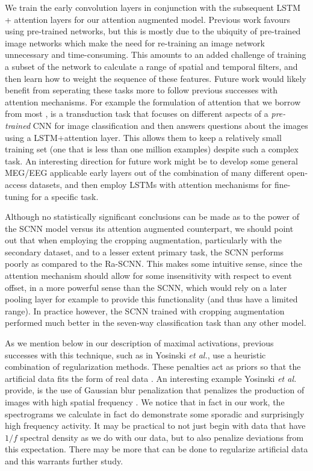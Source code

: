 \documentclass[fleqn,10pt]{wlscirep}
\begin{document}
We train the early convolution layers in conjunction with the subsequent LSTM + attention layers for our attention augmented model. Previous work favours using pre-trained networks, but this is mostly due to the ubiquity of pre-trained image networks which make the need for re-training an image network unnecessary and time-consuming. This amounts to an added challenge of training a subset of the network to calculate a range of spatial and temporal filters, and then learn how to weight the sequence of these features. Future work would likely benefit from seperating these tasks more to follow previous successes with attention mechanisms. For example the formulation of attention that we borrow from most \cite{Zhu}, is a transduction task that focuses on different aspects of a {\em pre-trained} CNN for image classification and then answers questions about the images using a LSTM+attention layer. This allows them to keep a relatively small training set (one that is less than one million examples) despite such a complex task. An interesting direction for future work might be to develop some general MEG/EEG applicable early layers out of the combination of many different open-access datasets, and then employ LSTMs with attention mechanisms for fine-tuning for a specific task.

Although no statistically significant conclusions can be made as to the power of the SCNN model versus its attention augmented counterpart, we should point out that when employing the cropping augmentation, particularly with the secondary dataset, and to a lesser extent primary task, the SCNN performs poorly as compared to the Ra-SCNN. This makes some intuitive sense, since the attention mechanism should allow for some insensitivity with respect to event offset, in a more powerful sense than the SCNN, which would rely on a later pooling layer for example to provide this functionality (and thus have a limited range). In practice however, the SCNN trained with cropping augmentation performed much better in the seven-way classification task than any other model.

As we mention below in our description of maximal activations, previous successes with this technique, such as in Yosinski {\em et al.}, use a heuristic combination of regularization methods. These penalties act as priors so that the artificial data fits the form of real data \cite{Yosinski2015}. An interesting example Yosinski {\em et al.} provide, is the use of Gaussian blur penalization that penalizes the production of images with high spatial frequency \cite{Yosinski2015}. We notice that in fact in our work, the spectrograms we calculate in fact do demonstrate some sporadic and surprisingly high frequency activity. It may be practical to not just begin with data that have $1/f$ spectral density as we do with our data, but to also penalize deviations from this expectation. There may be more that can be done to regularize artificial data and this warrants further study.
\end{document}
